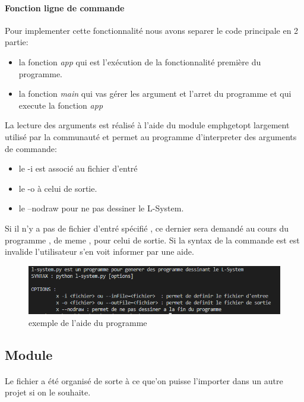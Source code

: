 \documentclass{report}
\begin{document}
			\paragraph{Fonction ligne de commande}
			Pour implementer cette fonctionnalité nous avons separer le code principale en 2 partie:
				\begin{itemize}
					\item la fonction \emph{app} qui est l'exécution de la fonctionnalité première du programme.
					\item la fonction \emph{main} qui vas gérer les argument et l'arret du programme et qui execute la fonction \emph{app}
				\end{itemize}
			La lecture des arguments est réalisé à l'aide du module emph{getopt} largement utilisé par la communauté et permet au programme d'interpreter des arguments de commande:
			\begin{itemize}
				\item le -i est associé au fichier d'entré 
				\item le -o à celui de sortie. 
				\item le --nodraw pour ne pas dessiner le L-System.
			\end{itemize} 
			Si il n'y a pas de fichier d'entré spécifié , ce dernier sera demandé au cours du programme , de meme , pour celui de sortie. 
			Si la syntax de la commande est est invalide l'utilisateur s'en voit informer par une aide.

			\begin{figure}[h]
				\begin{center}
					\includegraphics[scale=0.75]{images/exemple_help.PNG}
					\caption{exemple de l'aide du programme}
				\end{center}
			\end{figure}

		\subsection{Module}
			\paragraph{}
			Le fichier a été organisé de sorte à ce que'on puisse l'importer dans un autre projet si on le souhaite.
\end{document}
